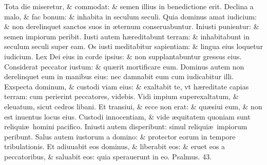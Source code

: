 \documentclass[a5paper,10pt]{book}
\def\ae{æ}
\begin{document}
\begin{multicols*}{2}
\newline \color{red} T\color{black}ota die miseretur, \& commodat: \& semen illius in benedictione erit.
\newline \color{red} D\color{black}eclina a malo, \& fac bonum: \& inhabita in seculum seculi.
\newline \color{red} Q\color{black}uia dominus amat iudicium: \& non derelinquet sanctos suos in \ae ternum conseruabuntur.
\newline \color{red} I\color{black}niusti punientur: \& semen impiorum peribit.
\newline \color{red} I\color{black}usti autem h\ae reditabunt terram: \& inhabitabunt in seculum seculi super eam.
\newline \color{red} O\color{black}s iusti meditabitur sapientiam: \& lingua eius loquetur iudicium.
\newline \color{red} L\color{black}ex Dei eius in corde ipsius: \& non supplantabuntur gressus eius.
\newline \color{red} C\color{black}onsiderat peccator iustum: \& qu\ae rit mortificare eum.
\newline \color{red} D\color{black}ominus autem non derelinquet eum in manibus eius: nec damnabit eum cum iudicabitur illi.
\newline \color{red} E\color{black}xspecta dominum, \& custodi viam eius: \& exaltabit te, vt h\ae reditate capias terram: cum perierint peccatores, videbis.
\newline \color{red} V\color{black}idi impium superexaltatum, \& eleuatum, sicut cedros libani.
\newline \color{red} E\color{black}t transiui, \& ecce non erat: \& qu\ae siui eum, \& non est inuentus locus eius.
\newline \color{red} C\color{black}ustodi innocentiam, \& vide \ae quitatem quoniam sunt reliqui\ae \ homini pacifico.
\newline \color{red} I\color{black}niusti autem disperibunt: simul reliqui\ae \ impiorum peribunt.%
\newline \color{red} S\color{black}alus autem iustorum a domino: \& protector eorum in tempore tribulationis.
\newline \color{red} E\color{black}t adiuuabit eos dominus, \& liberabit eos: \& eruet eos a peccatoribus, \& saluabit eos: quia sperauerunt in eo.
\newline \color{red} Psalmus. \hypertarget{ps43}{43.} \color{black}
\vspace{-1em}

\end{multicols*}
\end{document}
